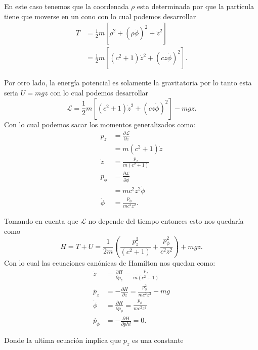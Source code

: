 \documentclass{report}
\newcommand{\Lag}{\mathcal{L}}
\begin{document}
\chapter{}

En este caso tenemos que la coordenada $\rho$ esta determinada por que la partícula tiene que moverse en un cono con lo cual podemos desarrollar
 \begin{align*}
  T &= \frac{1}{2}m\left[ \dot{\rho}^2 + \left( \rho \dot{\phi} \right)^2 + \dot{z}^2 \right]  \\
  &= \frac{1}{2}m\left[ \left( c^2 + 1 \right)\dot{z}^2 + \left( cz \dot{\phi} \right)^2 \right]
.\end{align*}

Por otro lado, la energía potencial es solamente la gravitatoria por lo tanto esta seria $U = mgz$ con lo cual podemos desarrollar  \[
\Lag = \frac{1}{2}m\left[ \left( c^2 + 1 \right)\dot{z}^2 + \left( cz \dot{\phi} \right)^2 \right] - mgz
.\] Con lo cual podemos sacar los momentos generalizados como:
\begin{align*}
  p_z &= \frac{\partial \Lag}{\partial \dot{z}}  \\
  &= m\left( c^2 + 1\right)\dot{z}  \\
  \dot{z} &= \frac{p_z}{m\left( c^2 + 1 \right) } \\
  p_\phi &= \frac{\partial \Lag}{\partial \dot{\phi}}  \\
  &= mc^2z^2 \dot{\phi}\\
  \dot{\phi} &= \frac{p_\phi}{mc^2z^2}
.\end{align*}

Tomando en cuenta que $\Lag$ no depende del tiempo entonces esto nos quedaría como \[
H = T + U = \frac{1}{2m}\left( \frac{p_z^2}{\left( c^2 + 1 \right) } + \frac{p_\phi^2}{c^2z^2}\right) + mgz
.\] Con lo cual las ecuaciones canónicas de Hamilton nos quedan como:
\begin{align*}
  \dot{z} &= \frac{\partial H}{\partial p_z} = \frac{p_z}{m\left( c^2 + 1 \right) } \\
  \dot{p_z} &= - \frac{\partial H}{\partial z} = \frac{p_\phi^2}{mc^2z^3} - mg \\
  \dot{\phi} &= \frac{\partial H}{\partial p_\phi} = \frac{p_\phi}{mc^2z^2} \\
  \dot{p_\phi} &= - \frac{\partial H}{\partial phi} = 0
.\end{align*}

Donde la ultima ecuación implica que $p_z$ es una constante
\end{document}

